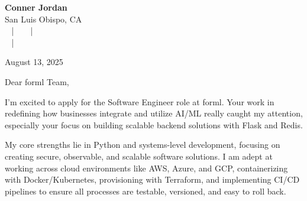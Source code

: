 \documentclass[letterpaper,11pt]{article}
\begin{document}
\begin{center}
  {\Huge \textbf{Conner Jordan}}\\[4pt]
  {\Large San Luis Obispo, CA}\\[4pt]
  \href{tel:+18059759793}{
    } ~ | ~
  \href{mailto:connercharlesjordan@gmail.com}{
    } ~ | ~
   \\
  \href{https://www.linkedin.com/in/conner-jordan-4b268514a/}{
    } ~ | ~
  \href{https://github.com/cjordan223}{
    }
\end{center}



\vspace{16pt}

\begin{flushright}
August 13, 2025
\end{flushright}



Dear forml Team,

\vspace{16pt}

I'm excited to apply for the Software Engineer role at forml. Your work in redefining how businesses integrate and utilize AI/ML really caught my attention, especially your focus on building scalable backend solutions with Flask and Redis.

\vspace{16pt}

My core strengths lie in Python and systems-level development, focusing on creating secure, observable, and scalable software solutions. I am adept at working across cloud environments like AWS, Azure, and GCP, containerizing with Docker/Kubernetes, provisioning with Terraform, and implementing CI/CD pipelines to ensure all processes are testable, versioned, and easy to roll back.

\vspace{16pt}
\end{document}
